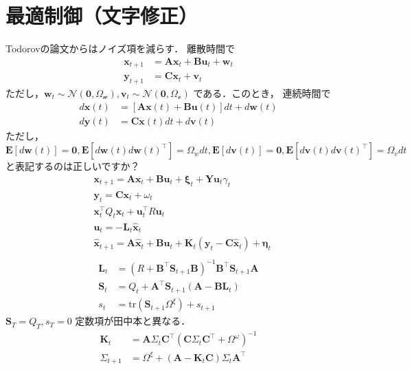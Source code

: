 \section{最適制御（文字修正）}
Todorovの論文からはノイズ項を減らす．
離散時間で
\begin{align}
\mathbf{x}_{t+1}&=\mathbf{A} \mathbf{x}_{t}+\mathbf{B} \mathbf{u}_{t}+\mathbf{w}_{t}\\
\mathbf{y}_{t+1}&=\mathbf{C} \mathbf{x}_{t}+\mathbf{v}_{t}
\end{align}
ただし，$\mathbf{w}_{t}\sim \mathcal{N(\mathbf{0}, \Omega_w)}, \mathbf{v}_{t}\sim \mathcal{N(\mathbf{0}, \Omega_v)}$ である．このとき，
連続時間で
\begin{align}
d\mathbf{x}(t)&=[\mathbf{A} \mathbf{x}(t)+\mathbf{B} \mathbf{u}(t)]dt+d\mathbf{w}(t)\\
d\mathbf{y}(t)&=\mathbf{C} \mathbf{x}(t)dt+d\mathbf{v}(t)
\end{align}
ただし，$\mathbf{E}[d\mathbf{w}(t)]=\mathbf{0}, \mathbf{E}[d\mathbf{w}(t)d\mathbf{w}(t)^\top]=\Omega_w dt, \mathbf{E}[d\mathbf{v}(t)]=\mathbf{0}, \mathbf{E}[d\mathbf{v}(t)d\mathbf{v}(t)^\top]=\Omega_v dt$
と表記するのは正しいですか？
\begin{align}
&\mathbf{x}_{t+1}=\mathbf{A} \mathbf{x}_{t}+\mathbf{B} \mathbf{u}_{t} +\boldsymbol{\xi}_{t}+\mathbf{Y}\mathbf{u}_{t}\gamma_t\\
&\mathbf{y}_{t}=\mathbf{C} \mathbf{x}_{t}+\omega_{t}\\
&\mathbf{x}_{t}^\top Q_{t} \mathbf{x}_{t}+\mathbf{u}_{t}^\top R \mathbf{u}_{t}\\
&\mathbf{u}_{t}=-\mathbf{L}_{t} \hat{\mathbf{x}}_{t}\\
&\hat{\mathbf{x}}_{t+1}=\mathbf{A} \hat{\mathbf{x}}_{t}+\mathbf{B} \mathbf{u}_{t}+\mathbf{K}_{t}\left(\mathbf{y}_{t}-\mathbf{C} \hat{\mathbf{x}}_{t}\right)+\boldsymbol{\eta}_{t} \\ 
\end{align}
\begin{align}
\mathbf{L}_{t}&=\left(R+\mathbf{B}^{\top} \mathbf{S}_{t+1} \mathbf{B}\right)^{-1} \mathbf{B}^{\top} \mathbf{S}_{t+1} \mathbf{A}\\
\mathbf{S}_{t}&=Q_{t}+\mathbf{A}^{\top} \mathbf{S}_{t+1}\left(\mathbf{A}-\mathbf{B} \mathbf{L}_{t}\right)\\
s_t &= \mathrm{tr}(\mathbf{S}_{t+1}\Omega^\xi) + s_{t+1}
\end{align}
$\mathbf{S}_{T}=Q_{T}, s_T=0$
定数項が田中本と異なる．
\begin{align}
\mathbf{K}_{t}&=\mathbf{A} \Sigma_{t} \mathbf{C}^{\top}\left(\mathbf{C} \Sigma_{t} \mathbf{C}^{\top}+\Omega^{\omega}\right)^{-1} \\ 
\Sigma_{t+1}&=\Omega^{\xi}+\left(\mathbf{A}-\mathbf{K}_{t} \mathbf{C}\right) \Sigma_{t} \mathbf{A}^{\top}
\end{align}
